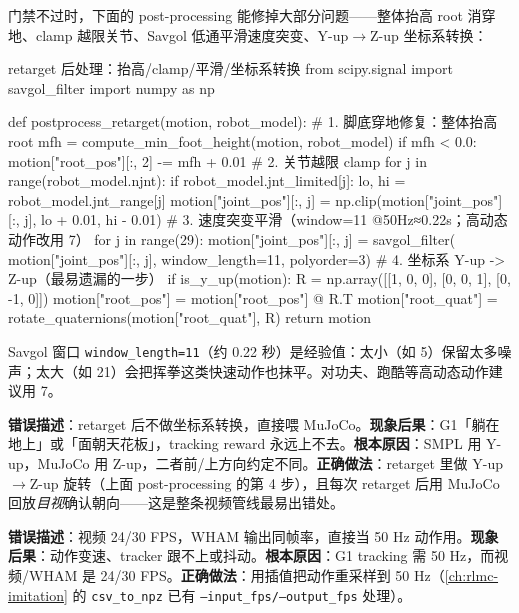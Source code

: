 门禁不过时，下面的 post-processing 能修掉大部分问题——整体抬高 root 消穿地、clamp 越限关节、Savgol 低通平滑速度突变、Y-up$\to$Z-up 坐标系转换：

\begin{codebox}[Python]{retarget 后处理：抬高/clamp/平滑/坐标系转换}
from scipy.signal import savgol_filter
import numpy as np

def postprocess_retarget(motion, robot_model):
    # 1. 脚底穿地修复：整体抬高 root
    mfh = compute_min_foot_height(motion, robot_model)
    if mfh < 0.0:
        motion["root_pos"][:, 2] -= mfh + 0.01
    # 2. 关节越限 clamp
    for j in range(robot_model.njnt):
        if robot_model.jnt_limited[j]:
            lo, hi = robot_model.jnt_range[j]
            motion["joint_pos"][:, j] = np.clip(motion["joint_pos"][:, j],
                                                lo + 0.01, hi - 0.01)
    # 3. 速度突变平滑（window=11 @50Hz≈0.22s；高动态动作改用 7）
    for j in range(29):
        motion["joint_pos"][:, j] = savgol_filter(
            motion["joint_pos"][:, j], window_length=11, polyorder=3)
    # 4. 坐标系 Y-up -> Z-up（最易遗漏的一步）
    if is_y_up(motion):
        R = np.array([[1, 0, 0], [0, 0, 1], [0, -1, 0]])
        motion["root_pos"] = motion["root_pos"] @ R.T
        motion["root_quat"] = rotate_quaternions(motion["root_quat"], R)
    return motion
\end{codebox}

Savgol 窗口 \verb|window_length=11|（约 0.22 秒）是经验值：太小（如 5）保留太多噪声；太大（如 21）会把挥拳这类快速动作也抹平。对功夫、跑酷等高动态动作建议用 7。

\begin{pitfall}
\textbf{错误描述}：retarget 后不做坐标系转换，直接喂 MuJoCo。\textbf{现象后果}：G1「躺在地上」或「面朝天花板」，tracking reward 永远上不去。\textbf{根本原因}：SMPL 用 Y-up，MuJoCo 用 Z-up，二者前/上方向约定不同。\textbf{正确做法}：retarget 里做 Y-up$\to$Z-up 旋转（上面 post-processing 的第 4 步），且每次 retarget 后用 MuJoCo 回放\emph{目视}确认朝向——这是整条视频管线最易出错处。
\end{pitfall}

\begin{pitfall}[视频帧率与控制频率不匹配]
\textbf{错误描述}：视频 24/30 FPS，WHAM 输出同帧率，直接当 50 Hz 动作用。\textbf{现象后果}：动作变速、tracker 跟不上或抖动。\textbf{根本原因}：G1 tracking 需 50 Hz，而视频/WHAM 是 24/30 FPS。\textbf{正确做法}：用插值把动作重采样到 50 Hz（\cref{ch:rlmc-imitation} 的 \texttt{csv\_to\_npz} 已有 \texttt{--input\_fps/--output\_fps} 处理）。
\end{pitfall}

